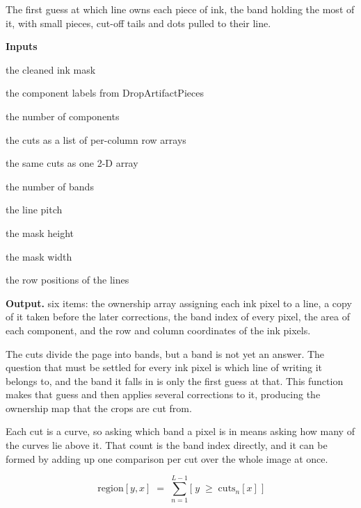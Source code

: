 The first guess at which line owns each piece of ink, the band holding the most of it, with small pieces, cut-off tails and dots pulled to their line.




\noindent\textbf{Inputs}
\begin{description}[leftmargin=2.2em,style=nextline,font=\normalfont\ttfamily]\setlength\itemsep{1pt}
  \item[{mask}] \normalfont the cleaned ink mask
  \item[{lab}] \normalfont the component labels from DropArtifactPieces
  \item[{nc}] \normalfont the number of components
  \item[{cuts}] \normalfont the cuts as a list of per-column row arrays
  \item[{cutsArr}] \normalfont the same cuts as one 2-D array
  \item[{L}] \normalfont the number of bands
  \item[{P}] \normalfont the line pitch
  \item[{H}] \normalfont the mask height
  \item[{W}] \normalfont the mask width
  \item[{centres}] \normalfont the row positions of the lines
\end{description}

\noindent\textbf{Output.} six items: the ownership array assigning each ink pixel to a line, a copy of it taken before the later corrections, the band index of every pixel, the area of each component, and the row and column coordinates of the ink pixels.


The cuts divide the page into bands, but a band is not yet an answer. The question that must be settled for every ink pixel is which line of writing it belongs to, and the band it falls in is only the first guess at that. This function makes that guess and then applies several corrections to it, producing the ownership map that the crops are cut from.


Each cut is a curve, so asking which band a pixel is in means asking how many of the curves lie above it. That count is the band index directly, and it can be formed by adding up one comparison per cut over the whole image at once.


\begin{equation}
\mathrm{region}[y,x] \;=\; \sum_{n=1}^{L-1} \big[\; y \;\ge\; \mathrm{cuts}_{n}[x] \;\big]
\end{equation}

